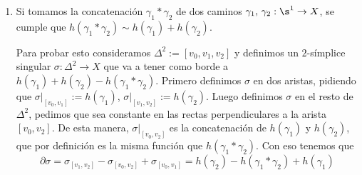 \begin{enumerate}[wide, labelwidth=0pt, labelindent=0pt]
Estos $\sigma_1$ y $\sigma_2$ cumplen 
$$\partial (\sigma_2 - \sigma_1) = \sigma_2|_{[v_2,v_3]} - \sigma_1|_{[v_1,v_3]} -\sigma_2|_{[v_0,v_3]} + \sigma_1|_{[v_0,v_3]} + \sigma_2|_{[v_0,v_2]} - \sigma_1|_{[v_0,v_1]} $$

Como la homotopía es a extremos fijos, los $\sigma_1|_{[v_1,v_3]}$ y $\sigma_2|_{[v_0,v_2]}$ son la imagen por $h$ de la función constante $x_0$, y entonces por la parte (\ref{ab1}) son homólogos a $0$.

Por definición, $\sigma_1|_{[v_0,v_3]}$ y $\sigma_2|_{[v_0,v_3]}$ son la misma función, y por lo tanto su diferencia se cancela en la suma de arriba.

Esto nos deja con $$\partial (\sigma_2 - \sigma_1) = \sigma_2|_{[v_2,v_3]} - \sigma_1|_{[v_0,v_1]} = h(\gamma_2) - h(\gamma_1)$$ que es exactamente lo que buscábamos, $h(\gamma_2) - h(\gamma_1)\sim 0$.

\item\label{ab3} Si tomamos la concatenación $\gamma_1 *\gamma_2$ de dos caminos $\gamma_1,\,\gamma_2:\s^1\to X$, se cumple que $h(\gamma_1 *\gamma_2)\sim h(\gamma_1) + h(\gamma_2)$.


Para probar esto consideramos $\Delta^2:=[v_0,v_1,v_2]$ y definimos un $2$-símplice singular $\sigma:\Delta^2\to X$ que va a tener como borde a $h(\gamma_1)+h(\gamma_2)-h(\gamma_1*\gamma_2)$. Primero definimos $\sigma$ en dos aristas, pidiendo que $\sigma|_{[v_0,v_1]}:={h(\gamma_1)}$, $\sigma|_{[v_1,v_2]}:={h(\gamma_2)}$. Luego definimos $\sigma$ en el resto de $\Delta^2$, pedimos que sea constante en las rectas perpendiculares a la arista $[v_0,v_2]$. De esta manera, $\sigma|_{[v_0,v_2]}$ es la concatenación de $h(\gamma_1)$ y $h(\gamma_2)$, que por definición es la misma función que $h(\gamma_1 * \gamma_2)$. Con eso tenemos que $$\partial\sigma = \sigma_{[v_1,v_2]}-\sigma_{[v_0,v_2]}+\sigma_{[v_0,v_1]}=h(\gamma_2)- h(\gamma_1 * \gamma_2) + h(\gamma_1)$$



\end{enumerate}
